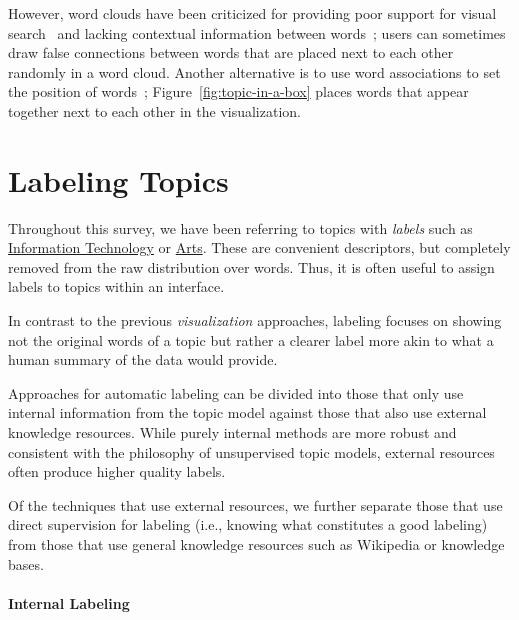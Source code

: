 However, word clouds have been criticized for providing poor support for visual
search~\citep{Viegas2008} and lacking contextual information between
words~\citep{harris11}; users can sometimes draw false connections between words
that are placed next to each other randomly in a word cloud.  Another
alternative is to use word associations to set the position of
words~\citep{Smith:Chuang:Hu:Boyd-Graber:Findlater-2014};
Figure~\ref{fig:topic-in-a-box} places words that appear together next to
each other in the visualization.



\section{Labeling Topics}

Throughout this survey, we have been referring to topics with \emph{labels} such as
\underline{Information Technology} or \underline{Arts}.  These are
convenient descriptors, but completely removed from the raw distribution over words.
Thus, it is often useful to assign labels to topics within an interface.

In contrast to the previous \emph{visualization} approaches, labeling
focuses on showing not the original words of a topic but rather a
clearer label more akin to what a human summary of the data would
provide.

Approaches for automatic labeling can be divided into those that only
use internal information from the topic model against those that also
use external knowledge resources.  While purely internal methods are
more robust and consistent with the philosophy of unsupervised topic
models, external resources often produce higher quality
labels.

Of the techniques that use external resources, we further separate
those that use direct supervision for labeling (i.e., knowing what
constitutes a good labeling) from those that use general knowledge
resources such as Wikipedia or knowledge bases.

\paragraph{Internal Labeling}

